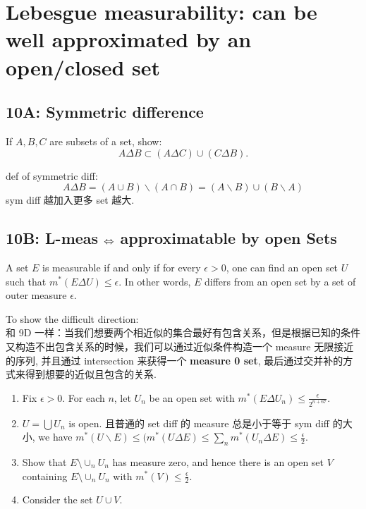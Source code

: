 \documentclass[lang=cn,11pt]{template}
\begin{document}
\section*{Lebesgue measurability: can be well approximated by an open/closed set}


\subsection*{10A: Symmetric difference}
If \( A, B, C \) are subsets of a set, show:
\[
A \Delta B \subset (A \Delta C) \cup (C \Delta B).
\]
\begin{remark}
def of symmetric diff: 
$$
A \Delta B =( A \cup B ) \backslash (A \cap B) = (A \backslash B) \cup (B\backslash A)
$$
sym diff 越加入更多 set 越大.
\end{remark}



\subsection*{10B: L-meas $\Leftrightarrow$ approximatable by open Sets}
\begin{theorem}
    A set \( E \) is measurable if and only if for every \( \epsilon > 0 \), one can find an open set \( U \) such that \( m^*(E \Delta U) \leq \epsilon \). In other words, \( E \) differs from an open set by a set of outer measure \( \epsilon \).
\end{theorem}


\begin{remark}
To show the difficult direction:\\
和 9D 一样：当我们想要两个相近似的集合最好有包含关系，但是根据已知的条件又构造不出包含关系的时候，我们可以通过近似条件构造一个 measure 无限接近的序列, 并且通过 intersection 来获得一个 \textbf{measure 0 set}, 最后通过交并补的方式来得到想要的近似且包含的关系.
\begin{enumerate}
    \item Fix \( \epsilon > 0 \). For each \( n \), let \( U_n \) be an open set with \( m^*(E \Delta U_n) \leq \frac{\epsilon}{2^{n+67}} \).
    \item \( U = \bigcup U_n \) is open. 且普通的 set diff 的 measure 总是小于等于 sym diff 的大小, we have \( m^*(U \backslash E) \leq ( m^*(U \Delta E)  \leq \sum_n m^*(U_n \Delta E) \leq \frac{\epsilon}{2} \).
    \item Show that \( E \setminus \cup_n U_n \) has measure zero, and hence there is an open set \( V \) containing \( E \setminus \cup_n U_n \) with \( m^*(V) \leq \frac{\epsilon}{2} \).
    \item Consider the set \( U \cup V \).
\end{enumerate}
\end{remark}
\end{document}
